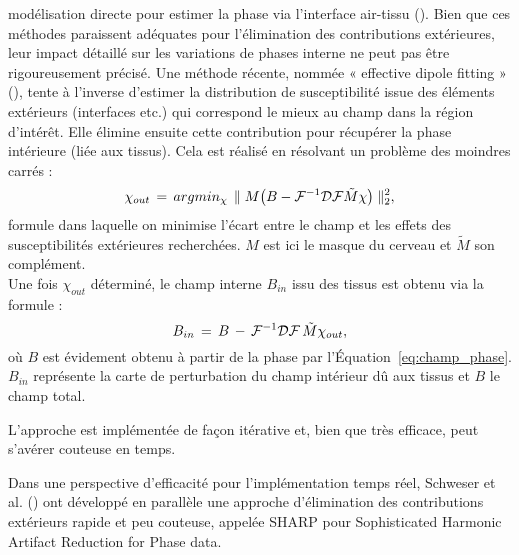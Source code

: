 {modélisation directe pour estimer la phase via l’interface air-tissu (\cite{Neelavalli2009}). Bien que ces méthodes
paraissent adéquates pour l’élimination des contributions extérieures, leur impact détaillé sur les
variations de phases interne ne peut pas être rigoureusement précisé. Une méthode récente, nommée
« effective dipole fitting » (\cite{Liu2011b}), tente à l’inverse d’estimer la distribution de susceptibilité issue des
éléments extérieurs (interfaces etc.) qui correspond le mieux au champ dans la région d’intérêt. Elle
élimine ensuite cette contribution pour récupérer la phase intérieure (liée aux tissus). Cela est réalisé
en résolvant un problème des moindres carrés :
\begin{equation}
\chi_{out}\,=\,argmin_{\chi}\,\parallel M\bigl(B-{\cal F}^{-1}{\cal D}{\cal F}\tilde{M}\chi\bigr)\parallel_2^2,
\end{equation}
formule dans laquelle on minimise l’écart entre le champ et les effets des susceptibilités extérieures recherchées. $M$ est ici le masque du cerveau et $\tilde{M}$ son complément.\\
Une fois $\chi_{out}$ déterminé, le champ interne $B_{in}$ issu des tissus est obtenu via la formule :
\begin{equation}
B_{in}\,=\,B\,-\,{\cal F}^{-1}{\cal D}{\cal F}\,\tilde{M}\chi_{out},
\end{equation}
où $B$ est évidement obtenu à partir de la phase par l’Équation~\ref{eq:champ_phase}. $B_{in}$ représente la carte de
perturbation du champ intérieur dû aux tissus et $B$ le champ total.

L’approche est implémentée de façon itérative et, bien que très efficace, peut s’avérer couteuse en
temps.

Dans une perspective d’efficacité pour l’implémentation temps réel, Schweser et al. (\cite{Schweser2011}) ont
développé en parallèle une approche d’élimination des contributions extérieurs rapide et peu
couteuse, appelée SHARP pour Sophisticated Harmonic Artifact Reduction for Phase data.

}
